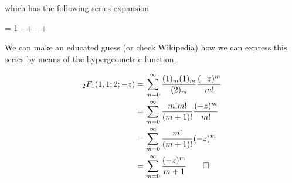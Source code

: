 \bee
{}
\eee

which has the following series expansion

\bee
{} = 1 -  +  -  +  \mp \cdots
\eee

We can make an educated guess (or check Wikipedia) how we can express this series by means of the hypergeometric function,

\begin{align*}
_2F_1(1,1;2;-z) &= \sum_{m=0}^\infty \frac{(1)_m (1)_m}{(2)_m} \frac{(-z)^m}{m!} \\
&= \sum_{m=0}^\infty \frac{m! m!}{(m+1)!} \frac{(-z)^m}{m!} \\
&= \sum_{m=0}^\infty \frac{m!}{(m+1)!} (-z)^m \\
&= \sum_{m=0}^\infty \frac{(-z)^m}{m+1} \qed
\end{align*}



